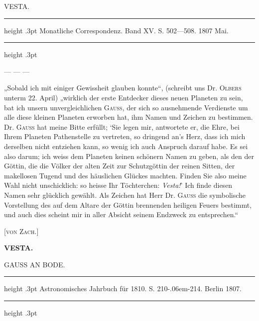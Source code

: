 \par\medskip
{}
\begin{center}
{\large VESTA.\par}\smallskip
\parbox{.76\linewidth}{%
\centering\fontsize{8.2}{10.2}\selectfont
\hrule height .3pt\relax\vspace{2.5pt}
Monatliche Correspondenz. Band XV. S. 502—508. 1807 Mai.\par
\vspace{2.5pt}\hrule height .3pt\relax
}
\end{center}

\par\indent --- --- ---

\par\indent „Sobald ich mit einiger Gewissheit glauben konnte“, (schreibt uns Dr. \textsc{Olbers} unterm 22. April)
„wirklich der erste Entdecker dieses neuen Planeten zu sein, bat ich unsern unvergleichlichen \textsc{Gauss},
der sich so ausnehmende Verdienste um alle diese kleinen Planeten erworben hat, ihm Namen und
Zeichen zu bestimmen. Dr. \textsc{Gauss} hat meine Bitte erfüllt; `Sie legen mir, antwortete er, die Ehre, bei
Ihrem Planeten Pathenstelle zu vertreten, so dringend an's Herz, dass ich mich derselben nicht entziehen kann, so wenig ich auch Anspruch darauf habe. Es sei also darum; ich weiss dem Planeten keinen schönern Namen zu geben, als den der Göttin, die die Völker der alten Zeit zur Schutzgöttin der
reinen Sitten, der makellosen Tugend und des häuslichen Glückes machten. Finden Sie also meine
Wahl nicht unschicklich: so heisse Ihr Töchterchen: \emph{Vesta!}' Ich finde diesen Namen sehr glücklich
gewählt. Als Zeichen hat Herr Dr. \textsc{Gauss} die symbolische Vorstellung des auf dem Altare der Göttin
brennenden heiligen Feuers \VestaAltarBody{} bestimmt, und auch dies scheint mir in aller Absicht seinem Endzweck
zu entsprechen.“

\par\nopagebreak[4]\noindent\hfill[\textsc{von Zach.}]\par
\clearpage
\thispagestyle{empty}
\noindent{}%
\makebox[12mm][l]{}%
\parbox[t]{\dimexpr\linewidth-24mm\relax}{\centering\footnotesize\bfseries VESTA.\par}%
\par\nobreak\medskip
\begin{center}
\large GAUSS AN BODE.
\end{center}

\begin{center}
\parbox{.71\linewidth}{%
\centering\fontsize{8.2}{10.2}\selectfont
\hrule height .3pt\relax\vspace{2.5pt}
Astronomisches Jahrbuch für 1810. S. 210-\kern.06em-214. Berlin 1807.\par
\vspace{2.5pt}\hrule height .3pt\relax
}
\end{center}

